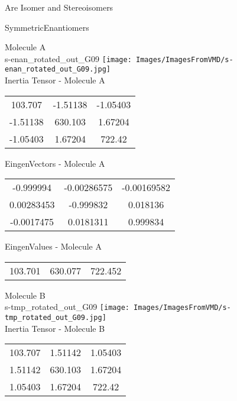 \begin{center}
\vtab
\vtab
\textcolor{NavyBlue}{\Large Are Isomer and Stereoisomers}
\end{center}
\newpage

\vtab[-2cm]
\begin{center}
{\large SymmetricEnantiomers}
\end{center}
\begin{multicols}{2}
\begin{center}
Molecule A \\ 
s-enan\_rotated\_out\_G09
\texttt{[image: Images/ImagesFromVMD/s-enan\_rotated\_out\_G09.jpg]}
\\
Inertia Tensor - Molecule A \\
\vtab
\begin{tabular}{|c c c|}
103.707	 & 	-1.51138	 & 	-1.05403	 \\
-1.51138	 & 	630.103	 & 	1.67204	 \\
-1.05403	 & 	1.67204	 & 	722.42
\end{tabular}

\vtab
 EingenVectors - Molecule A     \\
\vtab
\begin{tabular}{|c c c|}
-0.999994	 & 	-0.00286575	 & 	-0.00169582	 \\
0.00283453	 & 	-0.999832	 & 	0.018136	 \\
-0.0017475	 & 	0.0181311	 & 	0.999834
\end{tabular}

\vtab
 EingenValues - Molecule A     \\
\vtab
\begin{tabular}{|c c c|}
103.701	 & 	630.077	 & 	722.452
\end{tabular}
\columnbreak

Molecule B \\ 
s-tmp\_rotated\_out\_G09
\texttt{[image: Images/ImagesFromVMD/s-tmp\_rotated\_out\_G09.jpg]}
\\
Inertia Tensor - Molecule B \\
\vtab
\begin{tabular}{|c c c|}
103.707	 & 	1.51142	 & 	1.05403	 \\
1.51142	 & 	630.103	 & 	1.67204	 \\
1.05403	 & 	1.67204	 & 	722.42
\end{tabular}


\end{center}
\end{multicols}
